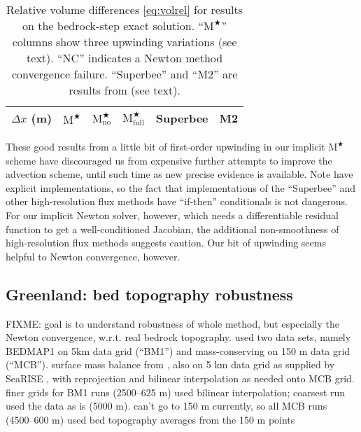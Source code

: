 \documentclass[twocolumn,letterpaper]{igs}
\newcommand{\Mstar}{$\text{M}^{\bigstar}$\xspace}
\newcommand{\Mstarnoup}{$\text{M}^{\bigstar}_{\text{no}}$\xspace}
\newcommand{\Mstarfullup}{$\text{M}^{\bigstar}_{\text{full}}$\xspace}
\begin{document}
\begin{table}[ht]
  \caption{Relative volume differences \eqref{eq:volrel} for results on the \cite{JaroschSchoofAnslow2013} bedrock-step exact solution.  ``\Mstar'' columns show three upwinding variations (see text).  ``NC'' indicates a Newton method convergence failure.  ``Superbee'' and ``M2'' are results from \cite{JaroschSchoofAnslow2013} (see text).}
  \vskip4mm \centering
  \begin{tabular}{lccccc}
    $\Delta x$ (m) & \Mstar & \Mstarnoup & \Mstarfullup & Superbee & M2 \\  \hline

  \end{tabular}
  \label{tab:bedstepvol}
\end{table}

These good results from a little bit of first-order upwinding in our implicit \Mstar scheme have discouraged us from expensive further attempts to improve the advection scheme, until such time as new precise evidence is available.  Note \cite{JaroschSchoofAnslow2013} have explicit implementations, so the fact that implementations of the ``Superbee'' and other high-resolution flux methods have ``if-then'' conditionals \citep{LeVeque2002} is not dangerous.  For our implicit Newton solver, however, which needs a differentiable residual function to get a well-conditioned Jacobian, the additional non-smoothness of high-resolution flux methods suggests caution.  Our bit of upwinding seems helpful to Newton convergence, however.


\subsection{Greenland: bed topography robustness}

FIXME: goal is to understand robustness of whole method, but especially the Newton convergence, w.r.t. real bedrock topography.  used two data sets, namely BEDMAP1 on 5km data grid \citep{Bamberetal2001} (``BM1'') and mass-conserving on 150 m data grid \citep{Morlighemetal2014} (``MCB'').  surface mass balance from \citep{Ettemaetal2009}, also on 5 km data grid as supplied by SeaRISE \citep{Bindschadleretal2013}, with reprojection and bilinear interpolation as needed onto MCB grid.  finer grids for BM1 runs (2500--625 m) used bilinear interpolation; coarsest run used the data as is (5000 m).  can't go to 150 m currently, so all MCB runs (4500--600 m) used bed topography averages from the 150 m points
\end{document}
